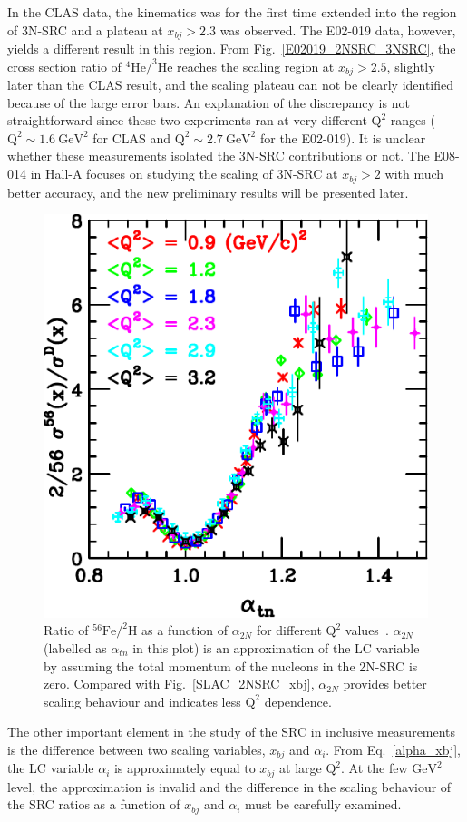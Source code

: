 In the CLAS data, the kinematics was for the first time extended into the region of 3N-SRC and a plateau at $x_{bj}>2.3$ was observed. The E02-019 data, however, yields a different result in this region. From Fig.~\ref{E02019_2NSRC_3NSRC}, the cross section ratio of $\mathrm{^{4}He/^{3}He}$ reaches the scaling region at $x_{bj}>2.5$, slightly later than the CLAS result, and the scaling plateau can not be clearly identified because of the large error bars. An explanation of the discrepancy is not straightforward since these two experiments ran at very different $\mathrm{Q^{2}}$ ranges ($\mathrm{Q^{2}\sim 1.6~GeV^{2}}$ for CLAS and $\mathrm{Q^{2}\sim 2.7~GeV^{2}}$ for the E02-019). It is unclear whether these measurements isolated the 3N-SRC contributions or not. The E08-014 in Hall-A focuses on studying the scaling of 3N-SRC at $x_{bj}>2$ with much better accuracy, and the new preliminary results will be presented later. 

\begin{figure}[!h]
  \begin{center}
        \includegraphics[type=pdf,ext=.pdf,read=.pdf,width=0.6\linewidth]{./figures/physics/SLAC_2NSRC_alpha}
        \caption[Ratio of $\mathrm{^{56}Fe/^{2}H}$ as a function of $\alpha_{2N}$ from SLAC]{\footnotesize{Ratio of $\mathrm{^{56}Fe/^{2}H}$ as a function of $\alpha_{2N}$ for different $\mathrm{Q^{2}}$ values~\cite{SLAC_Measurement_PRC.48.2451}. $\alpha_{2N}$ (labelled as $\alpha_{tn}$ in this plot) is an approximation of the LC variable by assuming the total momentum of the nucleons in the 2N-SRC is zero. Compared with Fig.~\ref{SLAC_2NSRC_xbj}, $\alpha_{2N}$ provides better scaling behaviour and indicates less $\mathrm{Q^{2}}$ dependence.}}
    \label{SLAC_2NSRC_alpha}
  \end{center}
\end{figure}
The other important element in the study of the SRC in inclusive measurements is the difference between two scaling variables, $x_{bj}$ and $\alpha_{i}$. From Eq.~\eqref{alpha_xbj}, the LC variable $\alpha_{i}$ is approximately equal to $x_{bj}$ at large $\mathrm{Q^{2}}$. At the few $\mathrm{GeV^{2}}$ level, the approximation is invalid and the difference in the scaling behaviour of the SRC ratios as a function of $x_{bj}$ and $\alpha_{i}$ must be carefully examined. 

